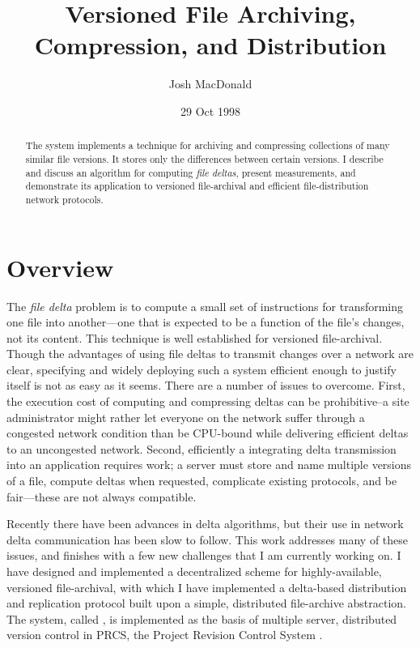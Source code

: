 \documentclass{llncs}
\title{Versioned File Archiving, Compression, and Distribution}
\author{Josh MacDonald\inst{1}}
\institute{University of California at Berkeley, Department of
Electrical Engineering and Computer Sciences, Berkeley CA 94720, USA
}
\date{29 Oct 1998}
\begin{document}


\maketitle
\begin{abstract}
The \xd {} system implements a technique for archiving and compressing
collections of many similar file versions.  It stores only the
differences between certain versions.  I describe and discuss an
algorithm for computing \emph{file deltas}, present measurements, and
demonstrate its application to versioned file-archival and efficient
file-distribution network protocols.
\end{abstract}


\section{Overview}

The \emph{file delta} problem is to compute a small set of
instructions for transforming one file into another---one that is
expected to be a function of the file's changes, not its content.
This technique is well established for versioned file-archival.
Though the advantages of using file deltas to transmit changes over a
network are clear, specifying and widely deploying such a system
efficient enough to justify itself is not as easy as it seems.  There
are a number of issues to overcome.  First, the execution cost of
computing and compressing deltas can be prohibitive--a site
administrator might rather let everyone on the network suffer through
a congested network condition than be CPU-bound while delivering
efficient deltas to an uncongested network.  Second, efficiently a
integrating delta transmission into an application requires work; a
server must store and name multiple versions of a file, compute deltas
when requested, complicate existing protocols, and be fair---these are
not always compatible.

Recently there have been advances in delta algorithms, but their use
in network delta communication has been slow to follow.  This work
addresses many of these issues, and finishes with a few new challenges
that I am currently working on.  I have designed and implemented a
decentralized scheme for highly-available, versioned file-archival,
with which I have implemented a delta-based distribution and
replication protocol built upon a simple, distributed file-archive
abstraction.  The system, called \xd, is implemented as the basis of
multiple server, distributed version control in PRCS, the Project
Revision Control System \cite{MacDonald:1998:SCM}.
\end{document}
